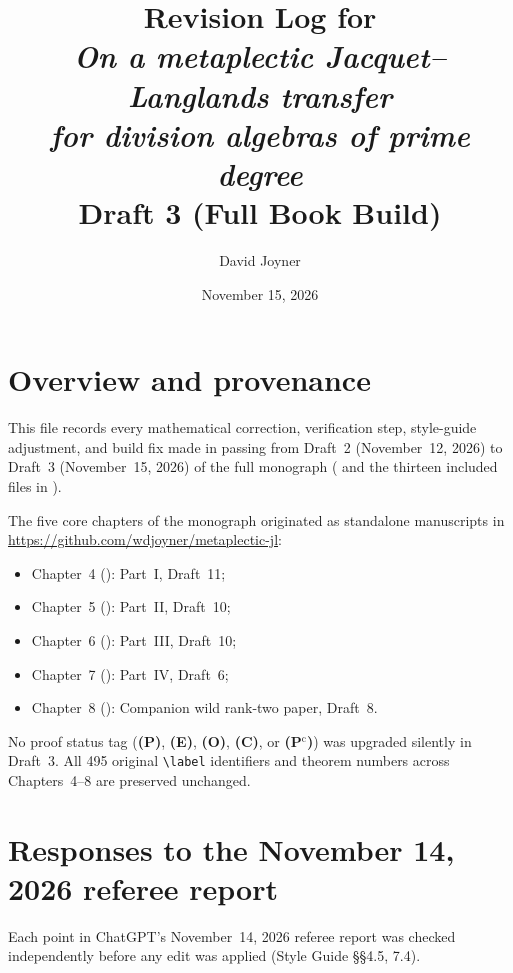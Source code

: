 \documentclass[12pt,letterpaper]{amsart}
\title[Draft 3 Revision Log]{Revision Log for\\\emph{On a metaplectic Jacquet--Langlands transfer\\for division algebras of prime degree}\\[0.5em]\normalsize Draft 3 (Full Book Build)}
\author{David Joyner}
\date{November 15, 2026}
\begin{document}
\maketitle

\section{Overview and provenance}
This file records every mathematical correction, verification step, style-guide adjustment, and build fix made in passing from Draft~2 (November~12, 2026) to Draft~3 (November~15, 2026) of the full monograph ( and the thirteen included files in ).

The five core chapters of the monograph originated as standalone manuscripts in \url{https://github.com/wdjoyner/metaplectic-jl}:
\begin{itemize}[leftmargin=*]
\item Chapter~4 (): Part~I, Draft~11;
\item Chapter~5 (): Part~II, Draft~10;
\item Chapter~6 (): Part~III, Draft~10;
\item Chapter~7 (): Part~IV, Draft~6;
\item Chapter~8 (): Companion wild rank-two paper, Draft~8.
\end{itemize}
No proof status tag (\textbf{(P)}, \textbf{(E)}, \textbf{(O)}, \textbf{(C)}, or \textbf{(P$^{\mathrm c}$)}) was upgraded silently in Draft~3. All 495 original \verb|\label| identifiers and theorem numbers across Chapters~4--8 are preserved unchanged.

\section{Responses to the November 14, 2026 referee report}
Each point in ChatGPT's November~14, 2026 referee report was checked independently before any edit was applied (Style Guide \S\S4.5, 7.4).
\end{document}
